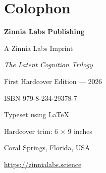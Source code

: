 \cleardoublepage
\chapter*{Colophon}
{}
\thispagestyle{empty}

\vspace*{0.35in}
\begin{center}
{\large\bfseries Zinnia Labs Publishing\par}
\vspace{0.05in}
{\small A Zinnia Labs Imprint\par}
\vspace{0.50in}
{\large\emph{The Latent Cognition Trilogy}\par}
\vspace{0.20in}
First Hardcover Edition --- 2026\par
ISBN 979-8-234-29378-7\par
\vspace{0.35in}
Typeset using \LaTeX\par
Hardcover trim: 6 $\times$ 9 inches\par
\vspace{0.35in}
Coral Springs, Florida, USA\par
\url{https://zinnialabs.science}\par
\end{center}
